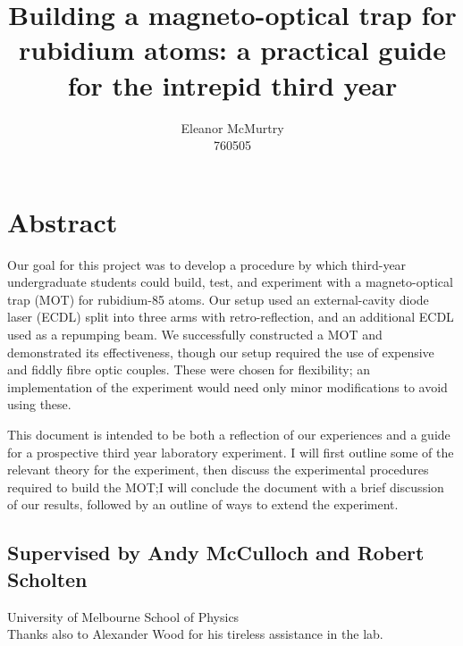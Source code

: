 \documentclass[11pt,twoside,a4paper]{article}
\author{Eleanor McMurtry\\760505}
\title{Building a magneto-optical trap for rubidium atoms: a practical guide for the intrepid third year}
\begin{document}
\maketitle
\section*{Abstract}
Our goal for this project was to develop a procedure by which third-year undergraduate students could
build, test, and experiment with a magneto-optical trap (MOT) for rubidium-85 atoms. Our setup used an external-cavity diode laser (ECDL)
split into three arms with retro-reflection, and an additional ECDL used as a repumping beam.
We successfully constructed a MOT and demonstrated its effectiveness, though our setup required the use of expensive and fiddly fibre optic couples.
These were chosen for flexibility; an implementation of the experiment would need only minor modifications
to avoid using these.

This document is intended to be both a reflection of our experiences and a guide for a prospective
third year laboratory experiment. I will first outline some of the relevant theory for the experiment,
then discuss the experimental procedures required to build the MOT;\@ I will conclude the document with a brief
discussion of our results, followed by an outline of ways to extend the experiment.

\begin{center}    
\subsection*{Supervised by Andy McCulloch and Robert Scholten}
University of Melbourne School of Physics\\
Thanks also to Alexander Wood for his tireless assistance in the lab.
\end{center}
\pagebreak
\tableofcontents
\vfill
\pagebreak
\end{document}
